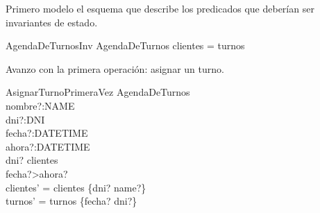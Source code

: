 \documentclass[%
  fleqn,colorlinks,linkcolor=blue,citecolor=blue,urlcolor=blue]{eptcs}
\begin{document}
  Primero modelo el esquema que describe los predicados que deber\'i{}an ser invariantes de estado.

  \begin{schema}{AgendaDeTurnosInv}
  AgendaDeTurnos
  \where
  \dom clientes = \dom turnos
  \end{schema}

  Avanzo con la primera operaci\'on: asignar un turno.

  \begin{schema}{AsignarTurnoPrimeraVez}
  \Delta AgendaDeTurnos \\
  nombre?:NAME \\
  dni?:DNI \\
  fecha?:DATETIME \\
  ahora?:DATETIME \\
  \where
  dni? \notin \dom clientes \\
  fecha?>ahora? \\
  clientes' = clientes \cup \{dni? \mapsto name?\} \\
  turnos' = turnos \oplus \{fecha? \mapsto dni?\} \\
  \end{schema}
\end{document}
